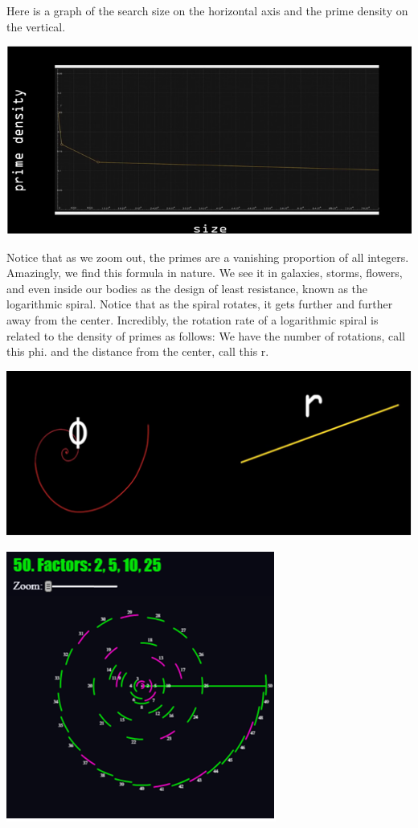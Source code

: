 \documentclass{report}
\begin{document}
Here is a graph of the search size on the horizontal axis and the prime density on the vertical.
\begin{center}
	\includegraphics[scale=1]{59.png}
\end{center}
 Notice that as we zoom out, the primes are a vanishing proportion of all integers. Amazingly, we find this formula in nature. We see it in galaxies, storms, flowers, and even inside our bodies as the design of least resistance, known as the logarithmic spiral. Notice that as the spiral rotates, it gets further and further away from the center. Incredibly, the rotation rate of a logarithmic spiral is related to the density of primes as follows: We have the number of rotations, call this phi. and the distance from the center, call this r.
\begin{center}
	\includegraphics[scale=1]{60.png}
\end{center}
\begin{center}
	\includegraphics[scale=1]{61.png}
\end{center}
\end{document}
